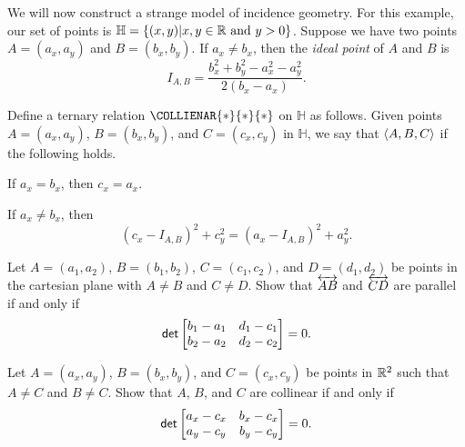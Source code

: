 We will now construct a strange model of incidence geometry.
For this example, our set of points is \(\mathbb{H} = \{ (x,y) | x,y \in \mathbb{R}\ \mathrm{and}\ y > 0 \}\).
Suppose we have two points \(A = (a_x, a_y)\) and \(B = (b_x, b_y)\). If \(a_x \neq b_x\), then the \emph{ideal point} of \(A\) and \(B\) is \[ I_{A,B} = \frac{b_x^2 + b_y^2 - a_x^2 - a_y^2}{2(b_x - a_x)}. \]

\begin{dfn}
Define a ternary relation \(\COLLIENAR{\ast}{\ast}{\ast}\) on \(\mathbb{H}\) as follows.
Given points \(A = (a_x, a_y)\), \(B = (b_x, b_y)\), and \(C = (c_x, c_y)\) in \(\mathbb{H}\), we say that \(\langle A, B, C \rangle\) if the following holds.
\begin{proplist}
\item If \(a_x = b_x\), then \(c_x = a_x\).
\item If \(a_x \neq b_x\), then \[ (c_x - I_{A,B})^2 + c_y^2 = (a_x - I_{A,B})^2 + a_y^2. \]
\end{proplist}

\end{dfn}




\Exercises%

\begin{exercise} \label{exerc:parallels-in-rr2}
Let \(A = (a_1,a_2)\), \(B = (b_1,b_2)\), \(C = (c_1,c_2)\), and \(D = (d_1,d_2)\) be points in the cartesian plane with \(A \neq B\) and \(C \neq D\).
Show that \(\overleftrightarrow{AB}\) and \(\overleftrightarrow{CD}\) are parallel if and only if \[ \mathsf{det} \begin{bmatrix} b_1 - a_1 & d_1 - c_1 \\ b_2 - a_2 & d_2 - c_2 \end{bmatrix} = 0. \]
\end{exercise}


\begin{exercise}
Let \(A = (a_x,a_y)\), \(B = (b_x,b_y)\), and \(C = (c_x,c_y)\) be points in \(\mathbb{R}^2\) such that \(A \neq C\) and \(B \neq C\).
Show that \(A\), \(B\), and \(C\) are collinear if and only if \[ \mathsf{det} \begin{bmatrix} a_x - c_x & b_x - c_x \\ a_y - c_y & b_y - c_y \end{bmatrix} = 0. \]
\end{exercise}
